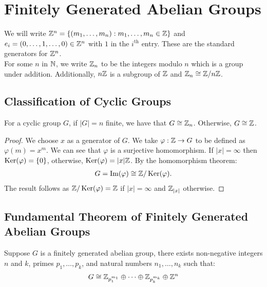 \section{Finitely Generated Abelian Groups}

We will write $\mathbb{Z}^n = \{(m_1, \ldots, m_n) : m_1, \ldots, m_n \in \mathbb{Z}\}$
and $e_i = (0, \ldots, 1, \ldots, 0) \in \mathbb{Z}^n$ with $1$ in the 
$i^{\text{th}}$ entry. These are the standard generators for $\mathbb{Z}^n$.
\\[\baselineskip]
For some $n$ in $\mathbb{N}$, we write $\mathbb{Z}_n$ to be the integers
modulo $n$ which is a group under addition. Additionally, $n\mathbb{Z}$
is a subgroup of $\mathbb{Z}$ and $\mathbb{Z}_n \cong \mathbb{Z}/n\mathbb{Z}$.

\subsection{Classification of Cyclic Groups}

For a cyclic group $G$, if $|G| = n$ finite, we have that $G \cong \mathbb{Z}_n$.
Otherwise, $G \cong \mathbb{Z}$.

\begin{proof}
    We choose $x$ as a generator of $G$. We take $\varphi : \mathbb{Z} \to G$
    to be defined as $\varphi(m) = x^m$. We can see that $\varphi$ is a
    surjective homomorphism. If $|x| = \infty$ then $\operatorname{Ker}(\varphi) = \{0\}$,
    otherwise, $\operatorname{Ker}(\varphi) = |x|\mathbb{Z}$. By the homomorphism theorem:
    \begin{align*}
        G = \operatorname{Im}(\varphi) \cong \mathbb{Z}/\operatorname{Ker}(\varphi).
    \end{align*} The result follows as $\mathbb{Z}/\operatorname{Ker}(\varphi) = \mathbb{Z}$
    if $|x| = \infty$ and $\mathbb{Z}_{|x|}$ otherwise.
\end{proof}

\subsection{Fundamental Theorem of Finitely Generated Abelian Groups}

Suppose $G$ is a finitely generated abelian group, there exists
non-negative integers $n$ and $k$, primes $p_1, \ldots, p_k$, and
natural numbers $n_1, \ldots, n_k$ such that: \begin{align*}
    G \cong \mathbb{Z}_{p_1^{m_1}} \oplus \cdots 
    \oplus \mathbb{Z}_{p_k^{m_k}} \oplus \mathbb{Z}^n
\end{align*}